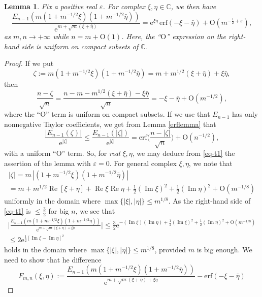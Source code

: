 \documentclass{birkart}
\newtheorem{lem}[thm]{Lemma}
\theoremstyle{definition}
\theoremstyle{remark}
\numberwithin{equation}{section}
\numberwithin{figure}{section}
\newcommand{\e}{\mathrm e}
\newcommand{\1}{{\mathbf 1}}
\newcommand{\C}{{\mathbb C}}
\newcommand{\Ordo}{\mathrm{O}}
\newcommand{\re}{\operatorname{Re}}
\newcommand{\im}{\operatorname{Im}}
\begin{document}
\begin{lem} \label{analyticbdrblowup}
Fix a positive real $\varepsilon$. For complex $\xi,\eta\in\C$, we then have
\[ 
\frac{E_{n-1}\left(m(1+m^{-1/2}\xi)(1+ m^{-1/2}\bar{\eta})\right)}
{\e^{m+ \sqrt{m}(\xi+\bar\eta)}} = \e^{\xi\bar{\eta}}
\,\mathrm{erf}(-\xi- \bar\eta)+\mathrm{O}(m^{-\frac12+\varepsilon}), 
\]
as $m,n\to+\infty$ while $n=m+\Ordo(1)$. 
Here, the ``$\Ordo$'' expression on the right-hand side is uniform on compact 
subsets of $\C$. 
\end{lem}

\begin{proof}
If we put 
\[
\zeta:=m(1+m^{-1/2}\xi)(1+m^{-1/2}\bar\eta)=m+m^{1/2}
(\xi+\bar\eta)+\xi\bar\eta,
\]
then 
\[
\frac{n-\zeta}{\sqrt{n}}=\frac{n-m-m^{1/2}(\xi+\bar\eta)-\xi\bar\eta}{\sqrt{n}}
=-\xi-\bar\eta+\Ordo(m^{-1/2}),
\]
where the ``O'' term is uniform on compact subsets. If we use that $E_{n-1}$
has only nonnegative Taylor coefficients, we get from Lemma \ref{erflemma}
that
\begin{equation}
\label{eq-t1}
\frac{|E_{n-1}(\zeta)|}{\e^{|\zeta|}}\le \frac{E_{n-1}(|\zeta|)}{\e^{|\zeta|}}
=\mathrm{erf}\bigg(\frac{n-|\zeta|}{\sqrt{n}}\bigg) 
+\Ordo(n^{-1/2}),
\end{equation}
with a uniform ``O'' term. So, for {\em real} $\xi,\eta$, we may deduce from
\eqref{eq-t1} the assertion of the lemma with $\varepsilon=0$. For general 
complex $\xi,\eta$, we note that
\begin{multline*}
|\zeta|=m\,|(1+m^{-1/2}\xi)(1+m^{-1/2}\bar\eta)|
\\
=m+m^{1/2}\re[\xi+\eta]+
\re\xi\re\eta+\tfrac12(\im\xi)^2+\tfrac12(\im\eta)^2+\Ordo(m^{-1/8})
\end{multline*}
uniformly in the domain where $\max\{|\xi|,|\eta|\}\le m^{1/8}$. As the
right-hand side of \eqref{eq-t1} is $\le\frac32$ for big $n$, we see that
\begin{multline*} 
\Bigg|\frac{E_{n-1}\left(m(1+m^{-1/2}\xi)(1+ m^{-1/2}{\eta})\right)}
{\e^{m+ \sqrt{m}(\xi+\eta)+\xi\bar\eta}}\Bigg|
\le\frac32\e^{-(\im\xi)(\im\eta)+\tfrac12(\im\xi)^2+\tfrac12(\im\eta)^2+
\Ordo(m^{-1/8})}
\\
\le2\e^{\frac12[\im\xi-\im\eta]^2} 
\end{multline*}
holds in the domain where $\max\{|\xi|,|\eta|\}\le m^{1/8}$, provided $m$
is big enough.
We need to show that he difference
\[ 
F_{m,n}(\xi,\eta):=\frac{E_{n-1}\left(m(1+m^{-1/2}{\xi})
(1+m^{-1/2}\bar\eta)\right)}{\e^{m+ \sqrt{m}(\xi+\bar\eta)+\xi\bar\eta}} - 
\mathrm{erf}(-\xi-\bar\eta) 
\]
\end{proof}
\end{document}

